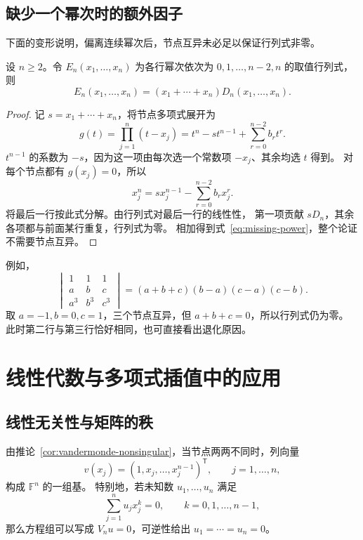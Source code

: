 \documentclass[UTF8,12pt,a4paper,fontset=fandol]{ctexart}
\begin{document}
\subsection{缺少一个幂次时的额外因子}

下面的变形说明，偏离连续幂次后，节点互异未必足以保证行列式非零。

\begin{proposition}[用 $n$ 次幂替换最后一行]
\label{prop:missing-power}
设 $n\geq2$。令 $E_n(x_1,\ldots,x_n)$ 为各行幂次依次为
$0,1,\ldots,n-2,n$ 的取值行列式，则
\begin{equation}
  E_n(x_1,\ldots,x_n)
  =(x_1+\cdots+x_n)D_n(x_1,\ldots,x_n).
  \label{eq:missing-power}
\end{equation}
\end{proposition}

\begin{proof}
记 $s=x_1+\cdots+x_n$，将节点多项式展开为
\[
  g(t)=\prod_{j=1}^n(t-x_j)
      =t^n-st^{n-1}+\sum_{r=0}^{n-2}b_rt^r.
\]
$t^{n-1}$ 的系数为 $-s$，因为这一项由每次选一个常数项 $-x_j$、其余均选 $t$ 得到。
对每个节点都有 $g(x_j)=0$，所以
\[
  x_j^n=sx_j^{n-1}-\sum_{r=0}^{n-2}b_rx_j^r.
\]
将最后一行按此式分解。由行列式对最后一行的线性性，
第一项贡献 $sD_n$，其余各项都与前面某行重复，行列式为零。
相加得到式~\eqref{eq:missing-power}，整个论证不需要节点互异。
\end{proof}

例如，
\[
  \begin{vmatrix}1&1&1\\a&b&c\\a^3&b^3&c^3\end{vmatrix}
  =(a+b+c)(b-a)(c-a)(c-b).
\]
取 $a=-1,b=0,c=1$，三个节点互异，但 $a+b+c=0$，所以行列式仍为零。
此时第二行与第三行恰好相同，也可直接看出退化原因。

\section{线性代数与多项式插值中的应用}

\subsection{线性无关性与矩阵的秩}

由推论~\ref{cor:vandermonde-nonsingular}，当节点两两不同时，列向量
\[
  v(x_j)=(1,x_j,\ldots,x_j^{n-1})^{\mathsf T},\qquad j=1,\ldots,n,
\]
构成 $\mathbb F^n$ 的一组基。
特别地，若未知数 $u_1,\ldots,u_n$ 满足
\[
  \sum_{j=1}^n u_jx_j^k=0,\qquad k=0,1,\ldots,n-1,
\]
那么方程组可以写成 $V_nu=0$，可逆性给出 $u_1=\cdots=u_n=0$。
\end{document}
